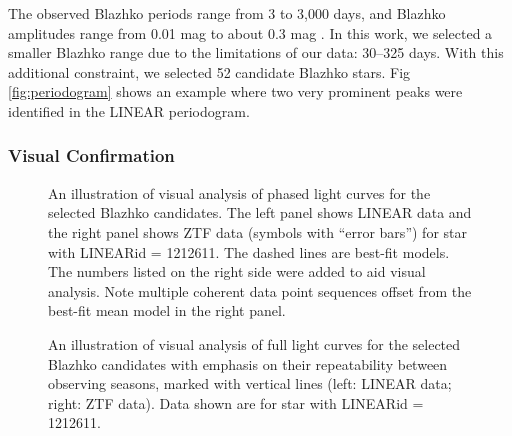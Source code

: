 The observed Blazhko periods range from 3 to 3,000 days, and Blazhko amplitudes range from 0.01 mag to about 0.3 mag \citep{2007MNRAS.377.1263S}. In this work, we selected a smaller Blazhko range due to the limitations of our data: 30--325 days. 
With this additional constraint, we selected 52 candidate Blazhko stars. 
Fig \ref{fig:periodogram} shows an example where two very prominent peaks were identified in the LINEAR periodogram. 



\subsubsection{Visual Confirmation}

\begin{figure}[ht]
  \centering
  \caption{An illustration of visual analysis of phased light curves for the selected Blazhko candidates. The left
    panel shows LINEAR data and the right panel shows ZTF data
    (symbols with ``error bars'') for star with LINEARid = 1212611. The dashed
    lines are best-fit models. The numbers listed on the right side were added to aid  visual analysis. Note
    multiple coherent data point sequences offset from the best-fit mean model in the right panel.}
       \label{fig:phase1}
\end{figure}

\begin{figure}[ht] 
    \centering
       \caption{An illustration of visual analysis of full light curves for the selected Blazhko candidates with emphasis
         on their repeatability between observing seasons, marked with  vertical lines (left: LINEAR data; right: ZTF data). Data
         shown are for star with LINEARid = 1212611. }
         \label{fig:phase3}
\end{figure}
       
